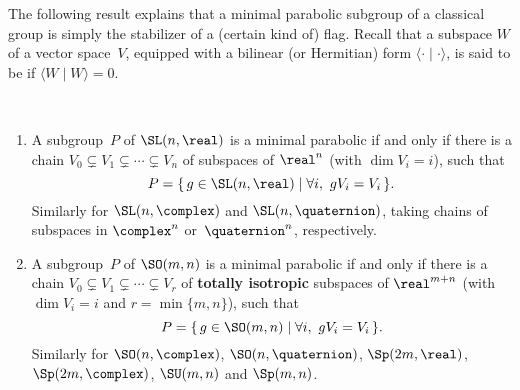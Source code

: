 The following result explains that a minimal parabolic subgroup of a
classical group is simply the stabilizer of a (certain kind
of) flag. 
Recall that
a subspace $W$
of a vector space~$V$, equipped with a bilinear (or Hermitian) form $\langle \cdot \mid \cdot \rangle$, is said to be  if $\langle W \mid W \rangle = 0$.

\begin{thm}[\csee{parab=Stab(flag)Ex}] \ \label{parab=Stab(flag)}
\noprelistbreak
 \begin{enumerate}
 \item \label{parab=Stab(flag)-SLn} 
 A subgroup~$P$ of\/ $\SL(n,\real)$ is a minimal parabolic if and
only if there is a chain $V_0 \subsetneq V_1 \subsetneq \cdots
\subsetneq V_n$ of subspaces of\/ $\real^n$ \textup(with $\dim V_i = i$\textup), such that
 $$ P = \{\, g \in \SL(n,\real) \mid
 \forall i, \ g V_i = V_i \,\} .$$
Similarly for\/ $\SL(n,\complex)$ and\/ $\SL(n,\quaternion)$,
taking chains of subspaces in\/ $\complex^n$
or\/~$\quaternion^n$, respectively.

\item \label{parab=Stab(flag)-SOmn} 
A subgroup~$P$ of\/ $\SO(m,n)$ is a minimal parabolic if and only
if there is a chain $V_0 \subsetneq V_1 \subsetneq \cdots
\subsetneq V_r$ of \textbf{totally isotropic} subspaces of $\real^{m+n}$ \textup(with $\dim V_i = i$ and $r = \min\{m,n\}$\textup), such that
 $$ P = \{\, g \in \SO(m,n) \mid
 \forall i, \ g V_i = V_i \,\} .$$
Similarly for\/ $\SO(n,\complex)$, $\SO(n,\quaternion)$,
$\Sp(2m,\real)$, $\Sp(2m,\complex)$, $\SU(m,n)$ and\/
$\Sp(m,n)$.
 \end{enumerate}
 \end{thm}

%

